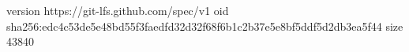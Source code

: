 version https://git-lfs.github.com/spec/v1
oid sha256:edc4c53de5e48bd55f3faedfd32d32f68f6b1c2b37e5e8bf5ddf5d2db3ea5f44
size 43840

